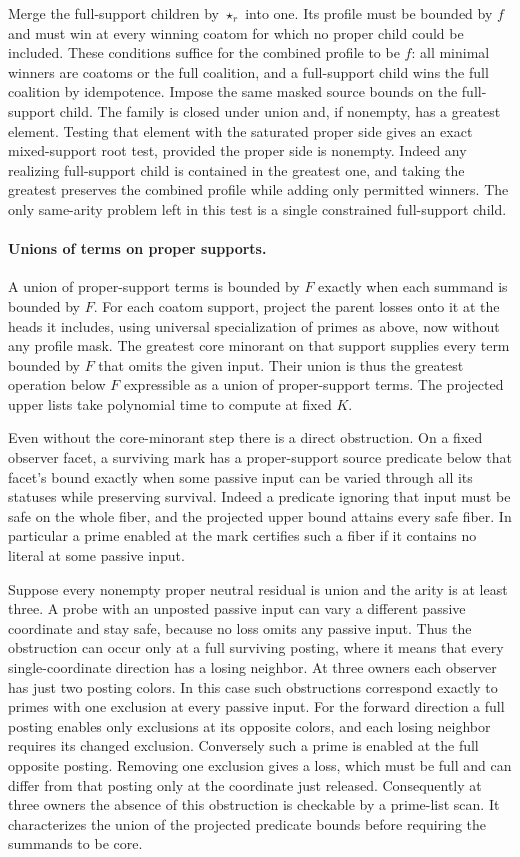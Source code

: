 Merge the full-support children by $\star_r$ into
one. Its profile must be bounded by $f$ and must
win at every winning coatom for which no proper
child could be included. These conditions suffice
for the combined profile to be $f$: all minimal
winners are coatoms or the full coalition, and a
full-support child wins the full coalition by
idempotence. Impose the same masked source bounds
on the full-support child. The family is closed
under union and, if nonempty, has a greatest
element. Testing that element with the saturated
proper side gives an exact mixed-support root test,
provided the proper side is nonempty. Indeed any
realizing full-support child is contained in the
greatest one, and taking the greatest preserves
the combined profile while adding only permitted
winners. The only same-arity problem left in this
test is a single constrained full-support child.

\paragraph{Unions of terms on proper supports.}
A union of proper-support terms is bounded by $F$
exactly when each summand is bounded by $F$. For
each coatom support, project the parent losses
onto it at the heads it includes, using universal
specialization of primes as above, now without
any profile mask. The greatest core minorant on
that support supplies every term bounded by $F$
that omits the given input. Their union is thus the
greatest operation below $F$ expressible as a union
of proper-support terms. The projected upper lists
take polynomial time to compute at fixed $K$.

Even without the core-minorant step there is a
direct obstruction. On a fixed observer facet, a
surviving mark has a proper-support source
predicate below that facet's bound exactly
when some passive input can be varied through all
its statuses while preserving survival. Indeed a
predicate ignoring that input must be safe on the
whole fiber, and the projected upper bound attains
every safe fiber. In particular a prime enabled at
the mark certifies such a fiber if it contains no
literal at some passive input.

Suppose every nonempty proper neutral residual is
union and the arity is at least three. A probe with
an unposted passive input can vary a different
passive coordinate and stay safe, because no loss
omits any passive input. Thus the obstruction can
occur only at a full surviving posting, where it
means that every single-coordinate direction has
a losing neighbor. At three owners each observer
has just two posting colors. In this case such
obstructions correspond exactly to primes with
one exclusion at every passive input. For the
forward direction a full posting enables only
exclusions at its opposite colors, and each
losing neighbor requires its changed exclusion.
Conversely such a prime is enabled at the full
opposite posting. Removing one exclusion gives
a loss, which must be full and can differ from
that posting only at the coordinate just released.
Consequently at three owners the absence of this
obstruction is checkable by a prime-list scan. It
characterizes the union of the projected predicate
bounds before requiring the summands to be core.

